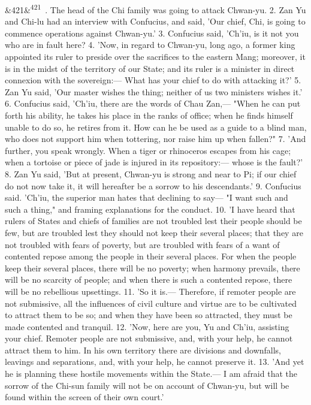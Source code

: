 \documentclass[12pt]{article}
\newcommand{\para}[1][]{\par\noindent\ifx&#1&\else\textsuperscript{\footnotesize #1}~\fi}
\begin{document}
\para[421] 1. The head of the Chi family was going to attack Chwan-yu. 2. Zan Yu and Chi-lu had an interview with Confucius, and said, 'Our chief, Chi, is going to commence operations against Chwan-yu.' 3. Confucius said, 'Ch'iu, is it not you who are in fault here? 4. 'Now, in regard to Chwan-yu, long ago, a former king appointed its ruler to preside over the sacrifices to the eastern Mang; moreover, it is in the midst of the territory of our State; and its ruler is a minister in direct connexion with the sovereign:--- What has your chief to do with attacking it?' 5. Zan Yu said, 'Our master wishes the thing; neither of us two ministers wishes it.' 6. Confucius said, 'Ch'iu, there are the words of Chau Zan,--- "When he can put forth his ability, he takes his place in the ranks of office; when he finds himself unable to do so, he retires from it. How can he be used as a guide to a blind man, who does not support him when tottering, nor raise him up when fallen?" 7. 'And further, you speak wrongly. When a tiger or rhinoceros escapes from his cage; when a tortoise or piece of jade is injured in its repository:--- whose is the fault?' 8. Zan Yu said, 'But at present, Chwan-yu is strong and near to Pi; if our chief do not now take it, it will hereafter be a sorrow to his descendants.' 9. Confucius said. 'Ch'iu, the superior man hates that declining to say--- "I want such and such a thing," and framing explanations for the conduct. 10. 'I have heard that rulers of States and chiefs of families are not troubled lest their people should be few, but are troubled lest they should not keep their several places; that they are not troubled with fears of poverty, but are troubled with fears of a want of contented repose among the people in their several places. For when the people keep their several places, there will be no poverty; when harmony prevails, there will be no scarcity of people; and when there is such a contented repose, there will be no rebellious upsettings. 11. 'So it is.--- Therefore, if remoter people are not submissive, all the influences of civil culture and virtue are to be cultivated to attract them to be so; and when they have been so attracted, they must be made contented and tranquil. 12. 'Now, here are you, Yu and Ch'iu, assisting your chief. Remoter people are not submissive, and, with your help, he cannot attract them to him. In his own territory there are divisions and downfalls, leavings and separations, and, with your help, he cannot preserve it. 13. 'And yet he is planning these hostile movements within the State.--- I am afraid that the sorrow of the Chi-sun family will not be on account of Chwan-yu, but will be found within the screen of their own court.'
\end{document}
